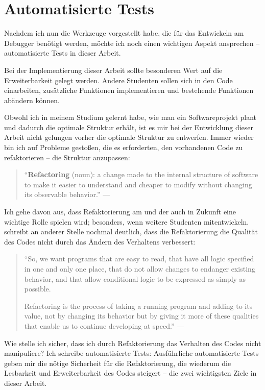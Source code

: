 \chapter{Automatisierte Tests}
Nachdem ich nun die Werkzeuge vorgestellt habe, die für das Entwickeln am Debugger benötigt werden, möchte ich noch einen wichtigen Aspekt ansprechen -- automatisierte Tests in dieser Arbeit.

Bei der Implementierung dieser Arbeit sollte besonderen Wert auf die Erweiterbarkeit gelegt werden. Andere Studenten sollen sich in den Code einarbeiten, zusätzliche Funktionen implementieren und bestehende Funktionen abändern können.

Obwohl ich in meinem Studium gelernt habe, wie man ein Softwareprojekt plant und dadurch die optimale Struktur erhält, ist es mir bei der Entwicklung dieser Arbeit nicht gelungen vorher die optimale Struktur zu entwerfen. Immer wieder bin ich auf Probleme gestoßen, die es erforderten, den vorhandenen Code zu refaktorieren -- die Struktur anzupassen:

\begin{quote}
  ``\textbf{Refactoring} (noun): a change made to the internal structure of software to make it easier to understand and cheaper to modify without changing its observable behavior.'' --- \cite[S.~53]{Fowler1999}
\end{quote}

Ich gehe davon aus, dass Refaktorierung am \md und der \mdg auch in Zukunft eine wichtige Rolle spielen wird; besonders, wenn weitere Studenten mitentwickeln.  schreibt an anderer Stelle nochmal deutlich, dass die Refaktorierung die Qualität des Codes nicht durch das Ändern des Verhaltens verbessert:

\begin{quote}
  ``So, we want programs that are easy to read, that have all logic specified in one and only one place, that do not allow changes to endanger existing behavior, and that allow conditional logic to be expressed as simply as possible.

  Refactoring is the process of taking a running program and adding to its value, not by changing its behavior but by giving it more of these qualities that enable us to continue developing at speed.'' --- \cite[S.~60]{Fowler1999}
\end{quote}

Wie stelle ich sicher, dass ich durch Refaktorierung das Verhalten des Codes nicht manipuliere? Ich schreibe automatisierte Tests: Ausführliche automatisierte Tests geben mir die nötige Sicherheit für die Refaktorierung, die wiederum die Lesbarkeit und Erweiterbarkeit des Codes steigert -- die zwei wichtigsten Ziele in dieser Arbeit.

